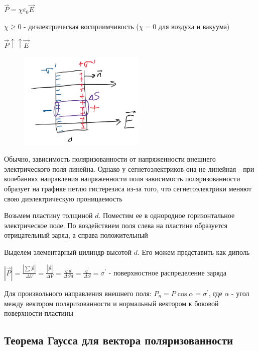\documentclass[12pt]{article}
\begin{document}
$\vec{P} = \chi \varepsilon_0 \vec{E}$

$\chi \geq 0$ - диэлектрическая восприимчивость ($\chi = 0$ для воздуха и вакуума)

$\vec{P} \uparrow\uparrow \vec{E}$

\begin{minipage}{\textwidth}
    \begin{figure}
        \includegraphics[width=6cm]{physics1/images/physics1_2024_12_09_1}
    \end{figure}

    Обычно, зависимость поляризованности от напряженности внешнего электрического поля линейна. 
    Однако у сегнетоэлектриков она не линейная - при колебаниях направления напряженности поля зависимость поляризованности
    образует на графике петлю гистерезиса из-за того, что сегнетоэлектрики меняют свою диэлектрическую проницаемость

    Возьмем пластину толщиной $d$. Поместим ее в однородное горизонтальное электрическое поле. 
    По воздействием поля слева на пластине образуется отрицательный заряд, а справа положительный

    Выделем элементарный цилиндр высотой $d$. Его можем представить как диполь

    $|\vec{P}| = \frac{|\sum \vec{p}|}{\Delta V} = \frac{|\vec{p}|}{\Delta V} = \frac{q^\prime d}{\Delta S d} = \frac{q^\prime}{\Delta S} = \sigma^\prime$ - поверхностное распределение заряда

    Для произвольного направления внешнего поля: $P_n = P \cos\alpha = \sigma^\prime$, где $\alpha$ - угол между вектором поляризованности и нормальный вектором к боковой поверхности пластины

\end{minipage}

\subsection{Теорема Гаусса для вектора поляризованности}
\end{document}
